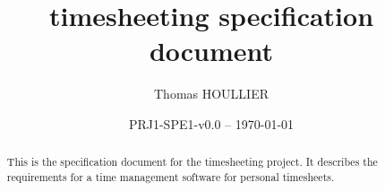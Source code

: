 \documentclass[letterpaper]{article}
\title{timesheeting specification document}
\author{Thomas HOULLIER}
\begin{document}
\frenchspacing
\date{PRJ1-SPE1-v0.0 -- \today}
\maketitle
\thispagestyle{FirstPage}

\begin{abstract}
  This is the specification document for the timesheeting project.
  It describes the requirements for a time management software for
  personal timesheets.
\end{abstract}

\begin{versionhistory}
\end{versionhistory}
\setcounter{table}{0} %

\tableofcontents
\printglossary[type=\acronymtype,style=index]
\pagestyle{plain}


\appendix
\cleardoublepage


\apptocmd{\thebibliography}{\raggedright}{}{}
\begingroup
{}
\setlength\bibitemsep{0pt}
\printbibliography
\endgroup
\end{document}
